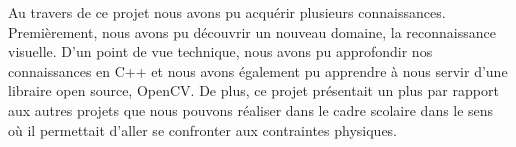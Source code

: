 \documentclass[a4paper]{article}
\begin{document}
Au travers de ce projet nous avons pu acquérir plusieurs connaissances. Premièrement,
nous avons pu découvrir un nouveau domaine, la reconnaissance visuelle. D'un point
de vue technique, nous avons pu approfondir nos connaissances en C++ et nous avons
également pu apprendre à nous servir d'une libraire open source, OpenCV.
De plus, ce projet présentait un plus par rapport aux autres projets que nous
pouvons réaliser dans le cadre scolaire dans le sens où il permettait d'aller
se confronter aux contraintes physiques.


\end{document}
